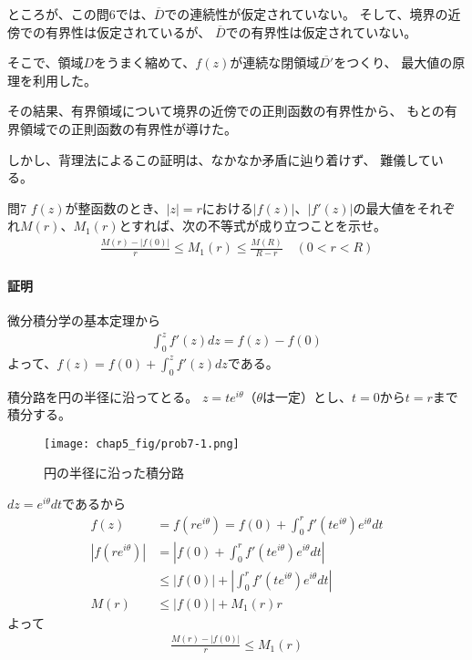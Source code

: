 ところが、この問6では、$\overline{D}$での連続性が仮定されていない。
そして、境界の近傍での有界性は仮定されているが、
$\overline{D}$での有界性は仮定されていない。

そこで、領域$D$をうまく縮めて、$f(z)$が連続な閉領域$\overline{D'}$をつくり、
最大値の原理を利用した。

その結果、有界領域について境界の近傍での正則函数の有界性から、
もとの有界領域での正則函数の有界性が導けた。

しかし、背理法によるこの証明は、なかなか矛盾に辿り着けず、
難儀している。

%
%
%
%
%

\begin{mysimplebox}{問7}
    $f(z)$が整函数のとき、$|z|=r$における$|f(z)|$、$|f'(z)|$の最大値をそれぞれ$M(r)$、$M_1(r)$とすれば、次の不等式が成り立つことを示せ。
    \begin{align*}
        \frac{M(r)-|f(0)|}{r}\le M_1(r)\le\frac{M(R)}{R-r}
        \quad(0<r<R)
    \end{align*}
\end{mysimplebox}
\paragraph{証明}
微分積分学の基本定理から
\begin{align*}
    \int_{0}^{z}f'(z)dz=f(z)-f(0)
\end{align*}
よって、$f(z)=f(0)+\int_{0}^{z}f'(z)dz$である。

積分路を円の半径に沿ってとる。
$z=te^{i\theta}$（$\theta$は一定）とし、$t=0$から$t=r$まで積分する。

\begin{figure}[h]
    \centering
    \texttt{[image: chap5\_fig/prob7-1.png]}
    \caption{円の半径に沿った積分路}
    \label{fig:chap5-7-1}
\end{figure}

$dz=e^{i\theta}dt$であるから
\begin{align*}
    f(z)&=f(re^{i\theta})
    =f(0)+\int_{0}^{r}f'(te^{i\theta})e^{i\theta}dt\\
    |f(re^{i\theta})|
    &=\left|f(0)+\int_{0}^{r}f'(te^{i\theta})e^{i\theta}dt\right|\\
    &\le|f(0)|+\left|\int_{0}^{r}f'(te^{i\theta})e^{i\theta}dt\right|\\
    M(r)&\le|f(0)|+M_1(r)r
\end{align*}
よって
\begin{align*}
    \frac{M(r)-|f(0)|}{r}\le M_1(r)
\end{align*}

